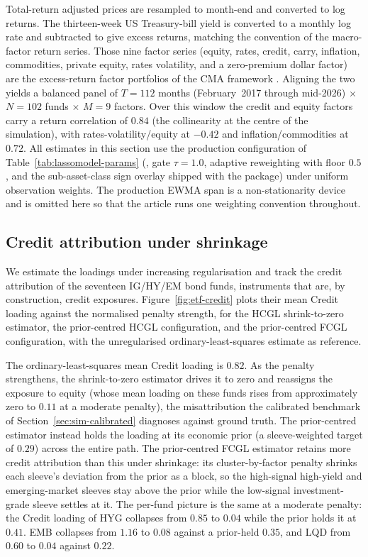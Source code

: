 \documentclass[article]{jss}
\begin{document}
Total-return adjusted prices are resampled to month-end and converted to
log returns. The thirteen-week US Treasury-bill yield is converted to a
monthly log rate and subtracted to give excess returns, matching the
convention of the macro-factor return series. Those nine factor series
(equity, rates, credit, carry, inflation, commodities, private
equity, rates volatility, and a zero-premium dollar factor) are the
excess-return factor portfolios of the CMA framework
\citep{Sepp+Hansen+Kastenholz:2026MATF}. Aligning the two yields a
balanced panel of $T = 112$ months (February~2017 through mid-2026)
$\times$ $N = 102$ funds $\times$ $M = 9$ factors. Over this window the
credit and equity factors carry a return correlation of $0.84$ (the
collinearity at the centre of the simulation), with
rates-volatility/equity at $-0.42$ and inflation/commodities at $0.72$.
All estimates in this section use the production configuration of
Table~\ref{tab:lassomodel-params} (, gate
$\tau = 1.0$, adaptive reweighting with floor $0.5$, and the
sub-asset-class sign overlay shipped with the package) under uniform
observation weights. The production EWMA span is a non-stationarity
device and is omitted here so that the article runs one weighting
convention throughout.


\subsection[Credit attribution under shrinkage]{Credit attribution under
shrinkage} \label{sec:application-etf-credit}

We estimate the loadings under increasing regularisation and track the
credit attribution of the seventeen IG/HY/EM bond funds, instruments
that are, by construction, credit exposures. Figure~\ref{fig:etf-credit}
plots their mean Credit loading against the normalised penalty strength,
for the HCGL shrink-to-zero estimator, the prior-centred HCGL
configuration, and the prior-centred FCGL configuration, with the
unregularised ordinary-least-squares estimate as reference.

The ordinary-least-squares mean Credit loading is $0.82$. As the penalty
strengthens, the shrink-to-zero estimator drives it to zero and reassigns
the exposure to equity (whose mean loading on these funds rises from
approximately zero to $0.11$ at a moderate penalty), the
misattribution the calibrated benchmark
of Section~\ref{sec:sim-calibrated} diagnoses against ground truth. The
prior-centred estimator instead holds the loading at its economic prior
(a sleeve-weighted target of $0.29$) across the entire path. The
prior-centred FCGL estimator retains more credit attribution than this
under shrinkage: its cluster-by-factor penalty shrinks each sleeve's
deviation from the prior as a block, so the high-signal high-yield and
emerging-market sleeves stay above the prior while the low-signal
investment-grade sleeve settles at it. The per-fund picture is the same
at a moderate penalty: the Credit loading of HYG collapses from $0.85$ to $0.04$ while the prior
holds it at $0.41$. EMB collapses from $1.16$ to $0.08$ against a
prior-held $0.35$, and LQD from $0.60$ to $0.04$ against $0.22$.
\end{document}
